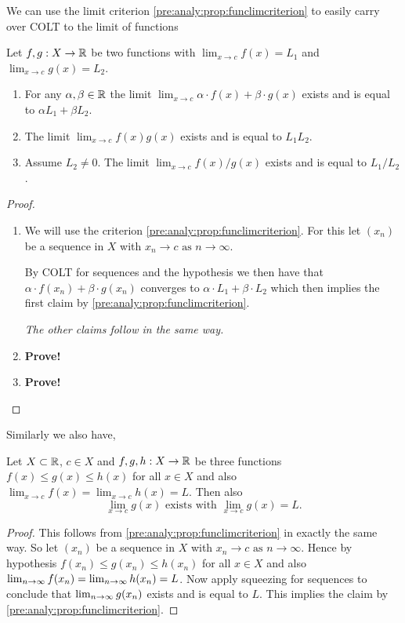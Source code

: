 \documentclass[10pt, a4paper]{article}
\newcommand{\limas}[3][n]{#2 \rightarrow #3 \text{ as } #1 \rightarrow \infty}
\begin{document}
We can use the limit criterion \autoref{pre:analy:prop:funclimcriterion} to easily carry over COLT to the limit of functions
\begin{theorem}
    Let $f, g : X \rightarrow \mathbb{R}$ be two functions with $\lim_{x \rightarrow c}f(x) = L_1$ and $\lim_{x \rightarrow c}g(x) = L_2$.
    \begin{enumerate}[label = (\roman*)]
        \item For any $\alpha, \beta \in \mathbb{R}$ the limit $\lim_{x \rightarrow c}\alpha\cdot f(x) + \beta\cdot g(x)$ exists and is equal to $\alpha L_1 + \beta L_2$.
        \item The limit $\lim_{x \rightarrow c}f(x)g(x)$ exists and is equal to $L_1L_2$.
        \item Assume $L_2 \neq 0$.
        The limit $\lim_{x \rightarrow c}f(x) / g(x)$ exists and is equal to $L_1 / L_2$.
    \end{enumerate}
    \begin{proof}
        \begin{enumerate}[label = (\roman*)]
        \item
            We will use the criterion \autoref{pre:analy:prop:funclimcriterion}.
            For this let $(x_n)$ be a sequence in $X$ with $\limas{x_n}{c}$.
    
            By COLT for sequences and the hypothesis we then have that $\alpha \cdot f(x_n) + \beta \cdot g(x_n)$ converges to $\alpha \cdot L_1 + \beta \cdot L_2$ which then implies the first claim by \autoref{pre:analy:prop:funclimcriterion}.
        
        \textit{The other claims follow in the same way.}
        \item \textbf{Prove!}
        \item \textbf{Prove!}
        \end{enumerate}
    \end{proof}
\end{theorem}

Similarly we also have,
\begin{theorem}
    Let $X \subset \mathbb{R}$,
    $c \in X$ and $f, g, h : X \rightarrow \mathbb{R}$ be three functions $f(x) \leq g(x) \leq h(x)$ for all $x \in X$ and also $\lim_{x \rightarrow c}f(x) = \lim_{x \rightarrow c}h(x) = L$.
    Then also
    \[
    \lim_{x \rightarrow c}g(x) \text{ exists with } \lim_{x \rightarrow c}g(x) = L.
    \]
    \begin{proof}
        This follows from \autoref{pre:analy:prop:funclimcriterion} in exactly the same way.
        So let $(x_n)$ be a sequence in $X$ with $\limas{x_n}{c}$.
        Hence by hypothesis $f(x_n) \leq g(x_n) \leq h(x_n)$ for all $x \in X$ and also $\lim_{n \rightarrow \infty} f(x_n) = \lim_{n \rightarrow \infty} h(x_n) = L$.
        Now apply squeezing for sequences to conclude that $\lim_{n \rightarrow \infty} g(x_n)$ exists and is equal to $L$.
        This implies the claim by \autoref{pre:analy:prop:funclimcriterion}.
    \end{proof}
\end{theorem}
\end{document}
